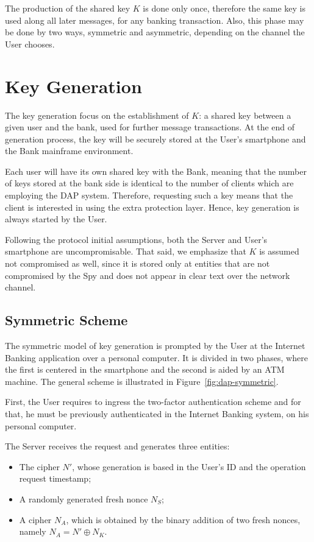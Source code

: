 The production of the shared key \(K\) is done only once, therefore the same key is used along all later messages, for any banking transaction. Also, this phase may be done by two ways, symmetric and asymmetric, depending on the channel the User chooses.





\section{Key Generation}
The key generation focus on the establishment of \(K\): a shared key between a given user and the bank, used for further message transactions. At the end of generation process, the key will be securely stored at the User's smartphone and the Bank mainframe environment.

Each user will have its own shared key with the Bank, meaning that the number of keys stored at the bank side is identical to the number of clients which are employing the DAP system. Therefore, requesting such a key means that the client is interested in using the extra protection layer. Hence, key generation is always started by the User.

Following the protocol initial assumptions, both the Server and User's smartphone are uncompromisable. That said, we emphasize that \(K\) is assumed not compromised as well, since it is stored only at entities that are not compromised by the Spy and does not appear in clear text over the network channel.



\subsection{Symmetric Scheme}
The symmetric model of key generation is prompted by the User at the Internet Banking application over a personal computer. It is divided in two phases, where the first is centered in the smartphone and the second is aided by an ATM machine. The general scheme is illustrated in Figure~\ref{fig:dap-symmetric}.

First, the User requires to ingress the two-factor authentication scheme and for that, he must be previously authenticated in the Internet Banking system, on his personal computer.

The Server receives the request and generates three entities:
\begin{itemize}
  \item The cipher \(N'\), whose generation is based in the User's ID and the operation request timestamp;

  \item A randomly generated fresh nonce \(N_S\);

  \item A cipher \(N_A\), which is obtained by the binary addition of two fresh nonces, namely \(N_A = N' \oplus N_K\).
\end{itemize}

